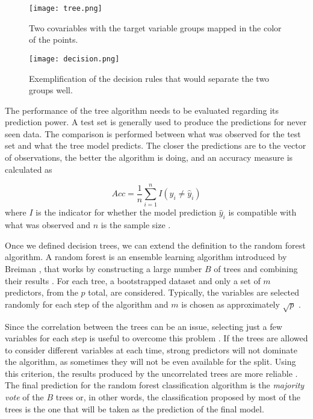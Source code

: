\documentclass[twocolumn]{article}
\begin{document}
\begin{figure}[t]
\centering
\texttt{[image: tree.png]}
\caption{Two covariables with the target variable groups mapped in the color of the points.}
\label{fig:tree}
\end{figure}

\begin{figure}[t]
\centering
\texttt{[image: decision.png]}
\caption{Exemplification of the decision rules that would separate the two groups well.}
\label{fig:decision}
\end{figure}

The performance of the tree algorithm needs to be evaluated regarding its prediction power. A test set is generally 
used to produce the predictions for never seen data. 
The comparison is performed between what was observed 
for the test set and what the tree model predicts. 
The closer the predictions are to the vector of observations,
the better the algorithm is doing, and an accuracy measure is calculated as 

\begin{equation}
Acc = \frac{1}{n} \sum_{i = 1}^{n}
I(y_i \neq \hat y_i)
\end{equation}
where $I$ is the indicator for whether the model
prediction $\hat y_i$ is compatible with 
what was observed and $n$ is the sample size 
\cite{Hastie}.

Once we defined decision trees, we can extend the definition to the random forest algorithm. 
A random forest is an ensemble learning algorithm
introduced by Breiman \cite{Breiman2001}, 
that works by constructing a large number $B$ 
of trees and combining their results \cite{Hastie}. 
For each tree, a bootstrapped dataset 
\cite{Efron1979} and only a set of 
$m$ predictors, from the $p$ total, are considered. 
Typically, the variables are selected randomly for
each step of the algorithm and $m$ is chosen as 
approximately $\sqrt p$ \cite{Hastie}.   

Since the correlation between the trees can be an issue,
selecting just a few variables for each step is useful to
overcome this problem \cite{Bernard2010}.
If the trees are allowed to consider different variables at
each time, strong predictors will not dominate the algorithm,
as sometimes they will not be even available
for the split. Using this criterion, 
the results produced by the uncorrelated trees are more reliable \cite{Hastie}. 
The final prediction for the random forest 
classification algorithm 
is the \textit{majority vote} of the $B$ trees or, 
in other words, the classification proposed
by most of the trees is the one that will be
taken as the prediction of the final model. 
\end{document}

